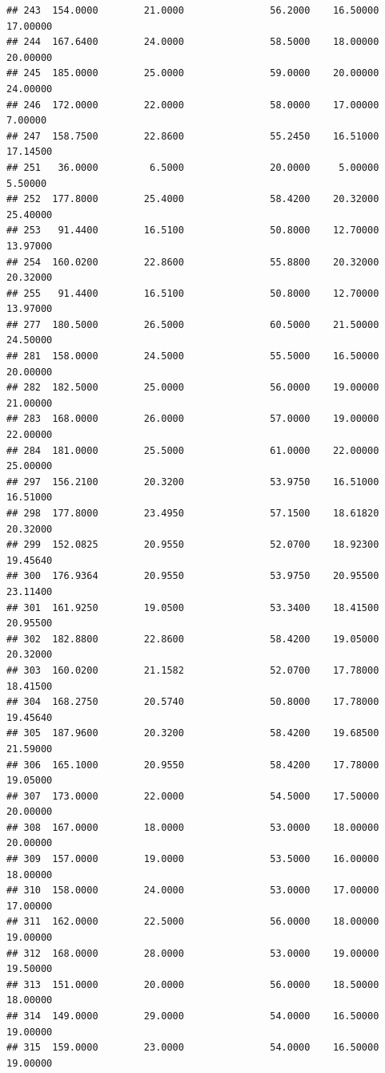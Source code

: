 \documentclass[]{article}
\begin{document}
\begin{verbatim}
## 243  154.0000        21.0000               56.2000    16.50000   17.00000
## 244  167.6400        24.0000               58.5000    18.00000   20.00000
## 245  185.0000        25.0000               59.0000    20.00000   24.00000
## 246  172.0000        22.0000               58.0000    17.00000    7.00000
## 247  158.7500        22.8600               55.2450    16.51000   17.14500
## 251   36.0000         6.5000               20.0000     5.00000    5.50000
## 252  177.8000        25.4000               58.4200    20.32000   25.40000
## 253   91.4400        16.5100               50.8000    12.70000   13.97000
## 254  160.0200        22.8600               55.8800    20.32000   20.32000
## 255   91.4400        16.5100               50.8000    12.70000   13.97000
## 277  180.5000        26.5000               60.5000    21.50000   24.50000
## 281  158.0000        24.5000               55.5000    16.50000   20.00000
## 282  182.5000        25.0000               56.0000    19.00000   21.00000
## 283  168.0000        26.0000               57.0000    19.00000   22.00000
## 284  181.0000        25.5000               61.0000    22.00000   25.00000
## 297  156.2100        20.3200               53.9750    16.51000   16.51000
## 298  177.8000        23.4950               57.1500    18.61820   20.32000
## 299  152.0825        20.9550               52.0700    18.92300   19.45640
## 300  176.9364        20.9550               53.9750    20.95500   23.11400
## 301  161.9250        19.0500               53.3400    18.41500   20.95500
## 302  182.8800        22.8600               58.4200    19.05000   20.32000
## 303  160.0200        21.1582               52.0700    17.78000   18.41500
## 304  168.2750        20.5740               50.8000    17.78000   19.45640
## 305  187.9600        20.3200               58.4200    19.68500   21.59000
## 306  165.1000        20.9550               58.4200    17.78000   19.05000
## 307  173.0000        22.0000               54.5000    17.50000   20.00000
## 308  167.0000        18.0000               53.0000    18.00000   20.00000
## 309  157.0000        19.0000               53.5000    16.00000   18.00000
## 310  158.0000        24.0000               53.0000    17.00000   17.00000
## 311  162.0000        22.5000               56.0000    18.00000   19.00000
## 312  168.0000        28.0000               53.0000    19.00000   19.50000
## 313  151.0000        20.0000               56.0000    18.50000   18.00000
## 314  149.0000        29.0000               54.0000    16.50000   19.00000
## 315  159.0000        23.0000               54.0000    16.50000   19.00000

\end{verbatim}
\end{document}
